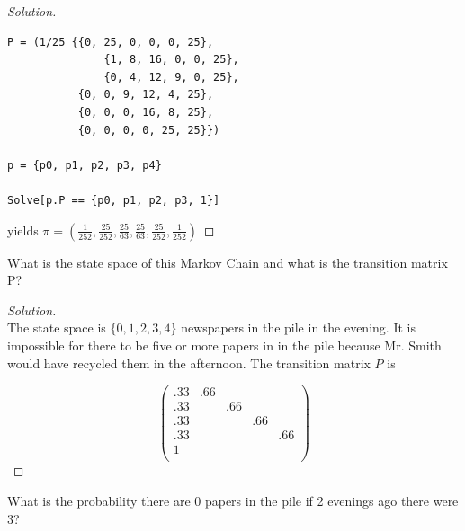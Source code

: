 \documentclass[12pt]{article}
\newenvironment{problem}[2][Problem]{\begin{trivlist}
\item[\hskip \labelsep {\bfseries #1}\hskip \labelsep {\bfseries #2.}]}{\end{trivlist}}
\newenvironment{solution}
  {\begin{proof}[Solution]\renewcommand{\qedsymbol}{}}
  {\end{proof}}
\begin{document}
\begin{solution}
\begin{lstlisting}[frame=single]  
P = (1/25 {{0, 25, 0, 0, 0, 25}, 
		       {1, 8, 16, 0, 0, 25}, 
		       {0, 4, 12, 9, 0, 25},
           {0, 0, 9, 12, 4, 25}, 
           {0, 0, 0, 16, 8, 25}, 
           {0, 0, 0, 0, 25, 25}})
  
p = {p0, p1, p2, p3, p4}  

Solve[p.P == {p0, p1, p2, p3, 1}]
\end{lstlisting}
yields $\pi = \left( \frac{1}{252}, \frac{25}{252}, \frac{25}{63}, \frac{25}{63}, \frac{25}{252}, \frac{1}{252} \right)$

\end{solution} 

\begin{problem}{2(a)} %
What is the state space of this Markov Chain and what is the transition matrix P?

\end{problem}

\begin{solution}\ \\

The state space is $\{0,1,2,3,4\}$ newspapers in the pile in the evening. It is impossible for there to be five or more papers in in the pile because Mr. Smith would have recycled them in the afternoon. The transition matrix $P$ is

$$\begin{pmatrix} 
	.33 & .66 &     &      &      \\ 
	.33 &     & .66 &      &      \\
	.33 &     &     & .66  &      \\ 
	.33 &     &     &      & .66  \\
	1   &     &     &      &      \\  
\end{pmatrix}$$
\end{solution}

\begin{problem}{2(b)} %
What is the probability there are 0 papers in the pile if 2 evenings ago there were 3?

\end{problem}
\end{document}
